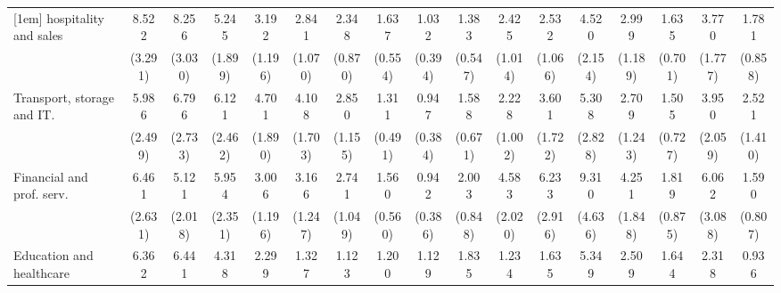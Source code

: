 {\begin{tabular}{l*{16}{c}}
[1em]
hospitality and sales&       8.522\sym{***}&       8.256\sym{***}&       5.245\sym{***}&       3.192\sym{**} &       2.841\sym{**} &       2.348\sym{*}  &       1.637         &       1.032         &       1.383         &       2.425\sym{*}  &       2.532\sym{*}  &       4.520\sym{**} &       2.999\sym{**} &       1.635         &       3.770\sym{**} &       1.781         \\
                    &     (3.291)         &     (3.030)         &     (1.899)         &     (1.196)         &     (1.070)         &     (0.870)         &     (0.554)         &     (0.394)         &     (0.547)         &     (1.014)         &     (1.066)         &     (2.154)         &     (1.189)         &     (0.701)         &     (1.777)         &     (0.858)         \\
[1em]
Transport, storage and IT.&       5.986\sym{***}&       6.796\sym{***}&       6.121\sym{***}&       4.701\sym{***}&       4.108\sym{***}&       2.850\sym{**} &       1.311         &       0.947         &       1.588         &       2.228         &       3.601\sym{**} &       5.308\sym{**} &       2.709\sym{*}  &       1.505         &       3.950\sym{**} &       2.521         \\
                    &     (2.499)         &     (2.733)         &     (2.462)         &     (1.890)         &     (1.703)         &     (1.155)         &     (0.491)         &     (0.384)         &     (0.671)         &     (1.002)         &     (1.722)         &     (2.828)         &     (1.243)         &     (0.727)         &     (2.059)         &     (1.410)         \\
[1em]
Financial and prof. serv.&       6.461\sym{***}&       5.121\sym{***}&       5.954\sym{***}&       3.006\sym{**} &       3.166\sym{**} &       2.741\sym{**} &       1.560         &       0.942         &       2.003         &       4.583\sym{***}&       6.233\sym{***}&       9.310\sym{***}&       4.251\sym{***}&       1.819         &       6.062\sym{***}&       1.590         \\
                    &     (2.631)         &     (2.018)         &     (2.351)         &     (1.196)         &     (1.247)         &     (1.049)         &     (0.560)         &     (0.386)         &     (0.848)         &     (2.020)         &     (2.916)         &     (4.636)         &     (1.848)         &     (0.875)         &     (3.088)         &     (0.807)         \\
[1em]
Education and healthcare&       6.362\sym{***}&       6.441\sym{***}&       4.318\sym{**} &       2.299         &       1.327         &       1.123         &       1.200         &       1.129         &       1.835         &       1.234         &       1.635         &       5.349\sym{**} &       2.509         &       1.644         &       2.318         &       0.936         \\

\end{tabular}}

